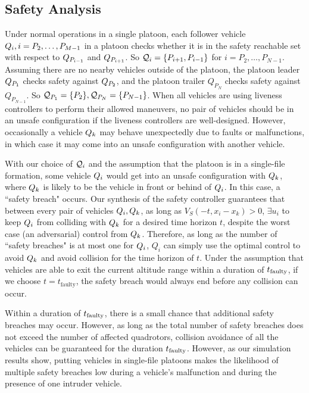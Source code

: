 \subsection{Safety Analysis}
Under normal operations in a single platoon, each follower vehicle $Q_{i},i=P_2,\ldots,P_{M-1}$ in a platoon checks whether it is in the safety reachable set with respect to $Q_{P_{i-1}}$ and $Q_{P_{i+1}}$. So $\mathcal{Q}_{i} = \{P_{i+1}, P_{i-1}\}$ for $i=P_2,\ldots,P_{N-1}$. Assuming there are no nearby vehicles outside of the platoon, the platoon leader $Q_{P_1}$ checks safety against $Q_{P_2}$, and the platoon trailer $Q_{P_N}$ checks safety against $Q_{P_{N-1}}$. So $\mathcal{Q}_{P_1}=\{P_2\}, \mathcal{Q}_{P_N}=\{P_{N-1}\}$. When all vehicles are using liveness controllers to perform their allowed maneuvers, no pair of vehicles should be in an unsafe configuration if the liveness controllers are well-designed. However, occasionally a vehicle $Q_{k}$ may behave unexpectedly due to faults or malfunctions, in which case it may come into an unsafe configuration with another vehicle.

With our choice of $\mathcal{Q}_{i}$ and the assumption that the platoon is in a single-file formation, some vehicle $Q_{i}$ would get into an unsafe configuration with $Q_{k}$, where $Q_{k}$ is likely to be the vehicle in front or behind of $Q_{i}$. In this case, a ``safety breach" occurs. Our synthesis of the safety controller guarantees that between every pair of vehicles $Q_{i},Q_{k}$, as long as $V_S(-t,x_i- x_k)>0$, $\exists u_i$ to keep $Q_{i}$ from colliding with $Q_{k}$ for a desired time horizon $t$, despite the worst case (an adversarial) control from $Q_{k}$. Therefore, as long as the number of ``safety breaches" is at most one for $Q_{i}$, $Q_i$ can simply use the optimal control to avoid $Q_{k}$ and avoid collision for the time horizon of $t$. Under the assumption that vehicles are able to exit the current altitude range within a duration of $t_\text{faulty}$, if we choose $t=t_\text{faulty}$, the safety breach would always end before any collision can occur. 

Within a duration of $t_\text{faulty}$, there is a small chance that additional safety breaches may occur. However, as long as the total number of safety breaches does not exceed the number of affected quadrotors, collision avoidance of all the vehicles can be guaranteed for the duration $t_\text{faulty}$. However, as our simulation results show, putting vehicles in single-file platoons makes the likelihood of multiple safety breaches low during a vehicle's malfunction and during the presence of one intruder vehicle. 

